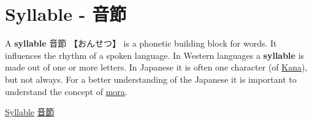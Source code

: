 \section{Syllable - 音節} \label{sec:Syllable}

A \textbf{syllable} {音節}  {【おんせつ】}  is a phonetic building block for
words. It influences the rhythm of a spoken language. In Western languages a
\textbf{syllable} is made out of one or more letters. In Japanese it is often
one character (of \hyperref[sec:Kana]{Kana}), but not always. For a better
understanding of the Japanese it is important to understand the concept of
\hyperref[sec:Mora]{mora}.

\Link \href{http://en.wikipedia.org/wiki/Syllable}{Syllable}
\Link \href{http://ja.wikipedia.org/wiki/%E9%9F%B3%E7%AF%80}{音節}

